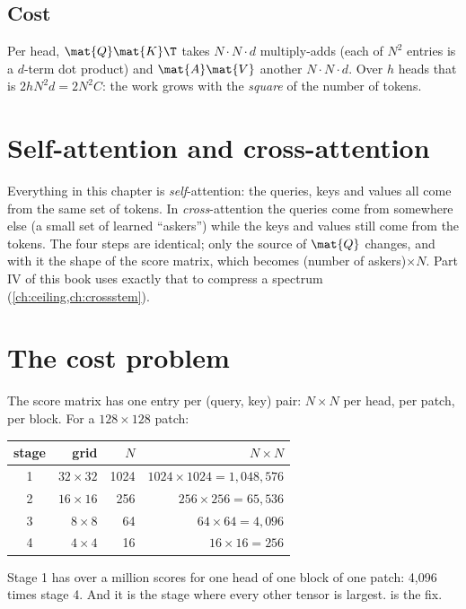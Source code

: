 \subsection{Cost}

Per head, $\mat{Q}\mat{K}\T$ takes $N\cdot N\cdot d$ multiply-adds (each of $N^2$ entries is a
$d$-term dot product) and $\mat{A}\mat{V}$ another $N\cdot N\cdot d$. Over $h$ heads that is
$2hN^2d = 2N^2C$: the work grows with the \emph{square} of the number of tokens.

\section{Self-attention and cross-attention}\label{sec:attention:cross}

Everything in this chapter is \emph{self}-attention: the queries, keys and
values all come from the same set of tokens. In \emph{cross}-attention the
queries come from somewhere else (a small set of learned ``askers'') while the keys and values
still come from the tokens. The four steps are identical; only the source of $\mat{Q}$ changes,
and with it the shape of the score matrix, which becomes (number of askers)$\times N$. Part IV of
this book uses exactly that to compress a spectrum (\cref{ch:ceiling,ch:crossstem}).


\section{The cost problem}\label{sec:attention:cost}

The score matrix has one entry per (query, key) pair: $N\times N$ per head, per patch, per block.
For a $128\times128$ patch:
\begin{center}
\begin{tabular}{crrr}
\toprule
stage & grid & $N$ & $N\times N$\\
\midrule
1 & $32\times32$ & 1024 & $1024\times1024 = 1{,}048{,}576$\\
2 & $16\times16$ & 256 & $256\times256 = 65{,}536$\\
3 & $8\times8$ & 64 & $64\times64 = 4{,}096$\\
4 & $4\times4$ & 16 & $16\times16 = 256$\\
\bottomrule
\end{tabular}
\end{center}
Stage 1 has over a million scores for one head of one block of one patch: 4{,}096 times stage 4.
And it is the stage where every other tensor is largest.  is the fix.

